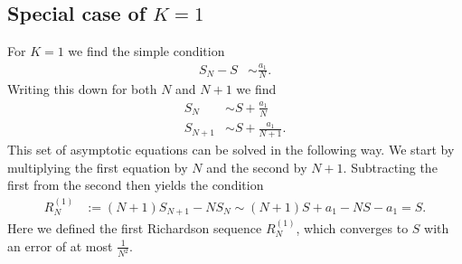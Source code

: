 \documentclass[english, parskip=full]{scrartcl}
\begin{document}
\subsection{Special case of $K=1$}
For $K=1$ we find the simple condition 
\begin{align}
S_N - S &\sim \frac{a_1}{N}.
\end{align}
Writing this down for both $N$ and $N+1$ we find
\begin{align}
S_N &\sim S + \frac{a_1}{N}\\
S_{N+1} &\sim S + \frac{a_1}{N+1}.
\end{align}
This set of asymptotic equations can be solved in the following way.
We start by multiplying the first equation by $N$ and the second by $N+1$. 
Subtracting the first from the second then yields the condition
\begin{align}
R_N^{(1)} &:= (N+1)S_{N+1} - NS_N \sim (N+1)S + a_1 - NS - a_1 = S.
\end{align}
Here we defined the first Richardson sequence $R_N^{(1)}$, which converges to $S$ with an error of at most $\frac{1}{N^2}$.
\end{document}
